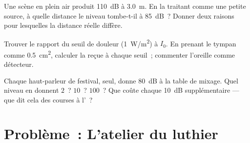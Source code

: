 \begin{exercise}[$\star\star\star$]\label{exo:g12:sound-acoustics:13}
Une scène en plein air produit \qty{110}{dB} à \qty{3.0}{m}. En la
traitant comme une petite source, à quelle distance le niveau tombe-t-il
à \qty{85}{dB}~? Donner deux raisons pour lesquelles la distance réelle
diffère.
\end{exercise}

\begin{exercise}[$\star\star\star$]\label{exo:g12:sound-acoustics:14}
Trouver le rapport du seuil de douleur (\qty{1}{W/m^2}) à $I_0$. En
prenant le tympan comme \qty{0.5}{cm^2}, calculer la
 reçue à chaque seuil~; commenter l'oreille comme
détecteur.
\end{exercise}

\begin{exercise}[$\star\star\star$]\label{exo:g12:sound-acoustics:15}
Chaque haut-parleur de festival, seul, donne \qty{80}{dB} à la
table de mixage. Quel niveau en donnent $2$~? $10$~? $100$~? Que
coûte chaque \qty{+10}{dB} supplémentaire --- que dit cela des courses
à l'~?
\end{exercise}

\section{Problème~: L'atelier du luthier}


